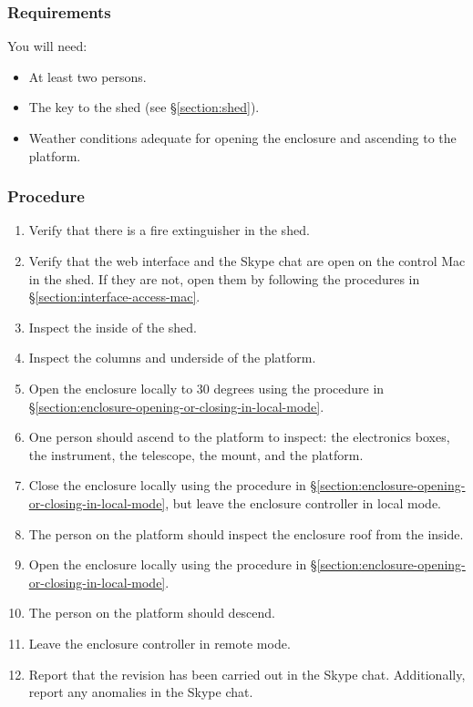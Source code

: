 \subsubsection{Requirements}

You will need:
\begin{itemize}
\item At least two persons.
\item The key to the shed (see \S\ref{section:shed}).
\item Weather conditions adequate for opening the enclosure and ascending to the platform.
\end{itemize}

\subsubsection{Procedure}

\begin{enumerate}
\item
Verify that there is a fire extinguisher in the shed.
\item 
Verify that the web interface and the Skype chat are open on the control Mac in the shed. If they are not, open them by following the procedures in \S\ref{section:interface-access-mac}.
\item 
Inspect the inside of the shed. 
\item 
Inspect the columns and underside of the platform.
\item
Open the enclosure locally to 30 degrees using the procedure in \S\ref{section:enclosure-opening-or-closing-in-local-mode}.
\item
One person should ascend to the platform to inspect: the electronics boxes, the instrument, the telescope, the mount, and the platform.
\item
Close the enclosure locally using the procedure in \S\ref{section:enclosure-opening-or-closing-in-local-mode}, but leave the enclosure controller in local mode.
\item
The person on the platform should inspect the enclosure roof from the inside.
\item
Open the enclosure locally using the procedure in \S\ref{section:enclosure-opening-or-closing-in-local-mode}.
\item
The person on the platform should descend.
\item
Leave the enclosure controller in remote mode.
\item
Report that the revision has been carried out in the Skype chat. Additionally, report any anomalies in the Skype chat.
\end{enumerate}

